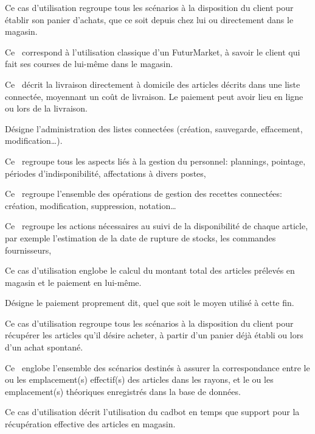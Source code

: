 Ce cas d'utilisation regroupe tous les scénarios à la disposition du client pour établir son panier d'achats, que ce soit depuis chez lui ou directement dans le magasin.

Ce \cu\ correspond à l'utilisation classique d'un FuturMarket, à savoir le client qui fait ses courses de lui-même dans le magasin.

Ce \cu\ décrit la livraison directement à domicile des articles décrits dans une liste connectée, moyennant un coût de livraison.
Le paiement peut avoir lieu en ligne ou lors de la livraison.

Désigne l'administration des listes connectées (création, sauvegarde, effacement, modification\dots).

Ce \cu\ regroupe tous les aspects liés à la gestion du personnel: plannings, pointage, périodes d'indisponibilité, affectations à divers postes, \etc

Ce \cu\ regroupe l'ensemble des opérations de gestion des recettes connectées: création, modification, suppression, notation\dots

Ce \cu\ regroupe les actions nécessaires au suivi de la disponibilité de chaque article, par exemple l'estimation de la date de rupture de stocks, les commandes fournisseurs, \etc

Ce cas d'utilisation englobe le calcul du montant total des articles prélevés en magasin et le paiement en lui-même.

Désigne le paiement proprement dit, quel que soit le moyen utilisé à cette fin.

Ce cas d'utilisation regroupe tous les scénarios à la disposition du client pour récupérer les articles qu'il désire acheter, à partir d'un panier déjà établi ou lors d'un achat spontané.

Ce \cu\ englobe l'ensemble des scénarios destinés à assurer la correspondance entre le ou les emplacement(s) effectif(s) des articles dans les rayons, et le ou les emplacement(s) théoriques enregistrés dans la base de données.

Ce cas d'utilisation décrit l'utilisation du cadbot en temps que support pour la récupération effective des articles en magasin.

